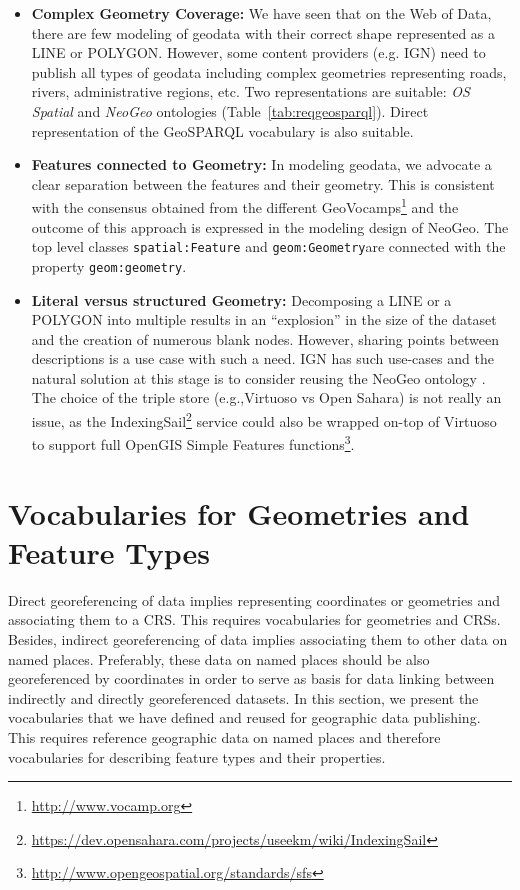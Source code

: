 \begin{itemize}
\item\textbf{Complex Geometry Coverage:} We have seen that on the Web of Data, there are few modeling of geodata with their correct shape represented as a LINE or POLYGON. However, some content providers (e.g. IGN) need to publish all types of geodata including complex geometries representing roads, rivers, administrative regions, etc. Two representations are suitable: \textit{OS Spatial} and \textit{NeoGeo} ontologies (Table~\ref{tab:reqgeosparql}). Direct representation of the GeoSPARQL vocabulary is also suitable.
\item \textbf{Features connected to Geometry:} In modeling geodata, we advocate a clear separation between the features and their geometry. This is consistent with the consensus obtained from the different GeoVocamps\footnote{\url{http://www.vocamp.org}} and the outcome of this approach is expressed in the modeling design of NeoGeo. The top level classes \texttt{spatial:Feature} and \texttt{geom:Geometry}are connected with the property \texttt{geom:geometry}.

\item \textbf{Literal versus structured Geometry:} Decomposing a LINE or a POLYGON into multiple results in an ``explosion'' in the size of the dataset and the creation of numerous blank nodes. However, sharing points between descriptions is a use case with such a need. IGN has such use-cases and the natural solution at this stage is to consider reusing the NeoGeo ontology . The choice of the triple store (e.g.,Virtuoso vs Open Sahara) is not really an issue, as the IndexingSail\footnote{\url{https://dev.opensahara.com/projects/useekm/wiki/IndexingSail}} service could also be wrapped on-top of Virtuoso to support full OpenGIS Simple Features functions\footnote{\url{http://www.opengeospatial.org/standards/sfs}}.
\end{itemize}


\section{Vocabularies for Geometries and Feature Types} \label{sec:topovocab}

Direct georeferencing of data implies representing coordinates or geometries and associating them to a CRS.  This requires vocabularies for geometries and CRSs. Besides, indirect georeferencing of data implies associating them to other data on named places. Preferably, these data on named places should be also georeferenced by coordinates in order to serve as basis for data linking between indirectly and directly georeferenced datasets. In this section, we present the vocabularies that we have defined and reused for geographic data publishing.
This requires reference geographic data on named places and therefore vocabularies for describing feature types and their properties. 

